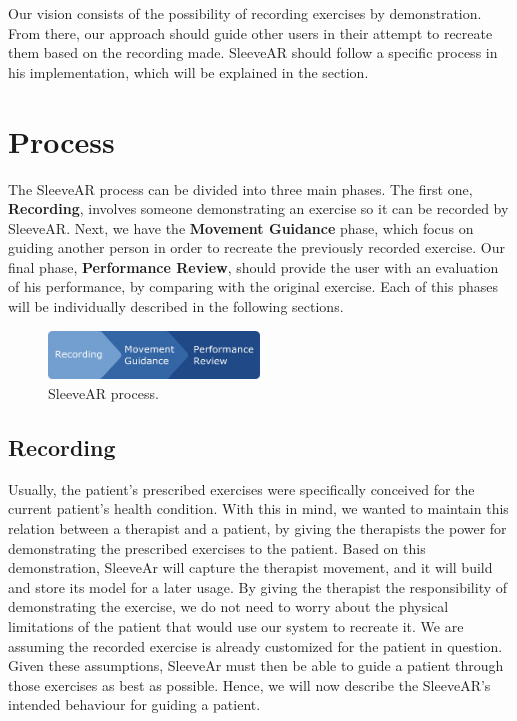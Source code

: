 Our vision consists of the possibility of recording exercises by demonstration. From there, our approach should guide other users in their attempt to recreate them based on the recording made.
SleeveAR should follow a specific process in his implementation, which will be explained in the section.

\section{Process}

The SleeveAR process can be divided into three main phases. 
The first one, \textbf{Recording}, involves someone demonstrating an exercise so it can be recorded by SleeveAR. 
Next, we have the \textbf{Movement Guidance} phase, which focus on guiding another person in order to recreate the previously recorded exercise.
Our final phase, \textbf{Performance Review}, should provide the user with an evaluation of his performance, by comparing with the original exercise.
Each of this phases will be individually described in the following sections.

\begin{figure}[!h]
    \begin{center}
        \includegraphics[width=0.5\textwidth]{imgs/approach/sleevear-progress}
    \end{center}
    \caption{SleeveAR process.}
    \label{fig:sleevear-progress}
\end{figure}

\subsection{Recording}

Usually, the patient's prescribed exercises were specifically conceived for the current patient's health condition. 
With this in mind, we wanted to maintain this relation between a therapist and a patient, by giving the therapists the power for demonstrating the prescribed exercises to the patient. 
Based on this demonstration, SleeveAr will capture the therapist movement, and it will build and store its model for a later usage.
By giving the therapist the responsibility of demonstrating the exercise, we do not need to worry about the physical limitations of the patient that would use our system to recreate it. 
We are assuming the recorded exercise is already customized for the patient in question.
Given these assumptions, SleeveAr must then be able to guide a patient through those exercises as best as possible. Hence, we will now describe the SleeveAR's intended behaviour for guiding a patient.


